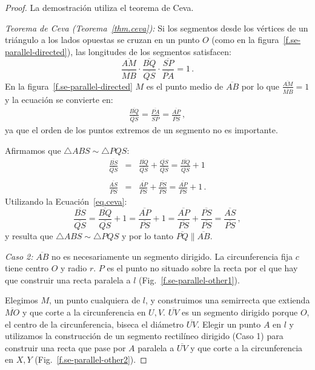\begin{proof}
La demostración utiliza el teorema de Ceva.

\textit{Teorema de Ceva  (Teorema~\ref{thm.ceva}):}
Si los segmentos desde los vértices de un triángulo a los lados opuestas se cruzan en un punto $O$ (como en la figura~\ref{f.se-parallel-directed}), las longitudes de los segmentos satisfacen:
\[
\frac{\overline{AM}}{\overline{MB}}\cdot\frac{\overline{BQ}}{\overline{QS}}\cdot\frac{\overline{SP}}{\overline{PA}} = 1\,.
\]
En la figura~\ref{f.se-parallel-directed} $M$ es el punto medio de $\overline{AB}$ por lo que $\displaystyle\frac{\overline{AM}}{\overline{MB}}=1$ y la ecuación se convierte en:
\begin{align}
\frac{\overline{BQ}}{\overline{QS}}=\frac{\overline{PA}}{\overline{SP}}=\frac{\overline{AP}}{\overline{PS}}\,,\label{eq.ceva}
\end{align}
ya que el orden de los puntos extremos de un segmento no es importante.

Afirmamos que $\triangle ABS \sim \triangle PQS$:
\begin{eqnarray*}
\frac{\overline{BS}}{\overline{QS}}&=&\frac{\overline{BQ}}{\overline{QS}}+\frac{\overline{QS}}{\overline{QS}} = \frac{\overline{BQ}}{\overline{QS}}+1\\
&&\\
\frac{\overline{AS}}{\overline{PS}} &=& \frac{\overline{AP}}{\overline{PS}} + \frac{\overline{PS}}{\overline{PS}} = \frac{\overline{AP}}{\overline{PS}} + 1\,.
\end{eqnarray*}
Utilizando la Ecuación~\ref{eq.ceva}:
\[
\frac{\overline{BS}}{\overline{QS}}=\frac{\overline{BQ}}{\overline{QS}}+1=\frac{\overline{AP}}{\overline{PS}}+1=\frac{\overline{AP}}{\overline{PS}}+\frac{\overline{PS}}{\overline{PS}}=\frac{\overline{AS}}{\overline{PS}}\,,
\]
y resulta que $\triangle ABS \sim \triangle PQS$ y por lo tanto $\overline{PQ}\parallel\overline{AB}$.

\textit{Caso 2:}
$\overline{AB}$ no es necesariamente un segmento dirigido. La circunferencia fija $c$ tiene centro $O$ y radio $r$. $P$ es el punto no situado sobre la recta por el que hay que construir una recta paralela a $l$ (Fig.~\ref{f.se-parallel-other1}).

Elegimos $M$, un punto cualquiera de $l$, y construimos una semirrecta que extienda $\overline{MO}$ y que corte a la circunferencia en $U,V$.
$\overline{UV}$ es un segmento dirigido porque $O$, el centro de la circunferencia, biseca el diámetro $\overline{UV}$. Elegir un punto $A$ en $l$ y utilizamos la construcción de un segmento rectilíneo dirigido (Caso 1) para construir una recta que pase por $A$ paralela a $\overline{UV}$ y que corte a la circunferencia en $X,Y$ (Fig.~\ref{f.se-parallel-other2}).


\end{proof}

